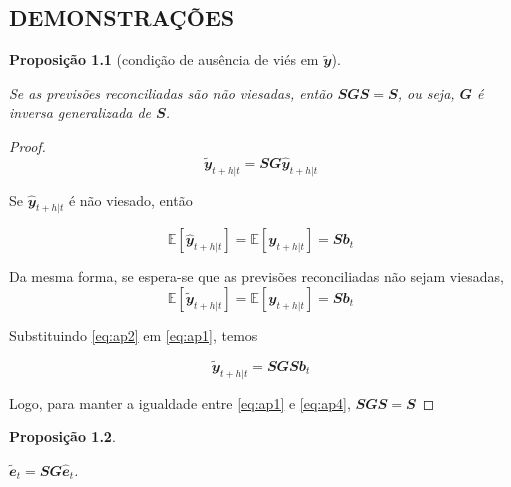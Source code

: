 \documentclass[
  12pt,
  twoside,
  openright,
  a4paper,
  chapter=TITLE,
  section=TITLE,
  brazil]{abntex2}
\newtheorem{proposition}{Proposição}[chapter]
\begin{document}
\begin{apendicesenv}
\chapter{DEMONSTRAÇÕES} \label{apendice_demonstracoes}

\begin{proposition}[condição de ausência de viés em $\mathbfit{\tilde{y}}$]
  \label{proposicao1}

  Se as previsões reconciliadas são não viesadas, então $\mathbfit{SGS=S}$, ou seja, $\mathbfit{G}$ é inversa generalizada de $\mathbfit{S}$.

\end{proposition}

\begin{proof}
  \begin{equation} \label{eq:ap1}
    \mathbfit{\tilde{y}}_{t+h|t} = \mathbfit{SG\hat{y}}_{t+h|t} 
  \end{equation}

  Se $\mathbfit{\hat{y}}_{t+h|t}$ é não viesado, então 

  \begin{equation} \label{eq:ap2}
      \mathbb{E}[\mathbfit{\hat{y}}_{t+h|t}] = \mathbb{E}[\mathbfit{y}_{t+h|t}] = \mathbfit{Sb}_t
  \end{equation}

  Da mesma forma, se espera-se que as previsões reconciliadas não sejam viesadas,
  \begin{equation} \label{eq:ap3}
      \mathbb{E}[\mathbfit{\tilde{y}}_{t+h|t}] = \mathbb{E}[\mathbfit{y}_{t+h|t}] = \mathbfit{Sb}_t
  \end{equation}

  Substituindo \eqref{eq:ap2} em \eqref{eq:ap1}, temos

  \begin{equation} \label{eq:ap4}
      \mathbfit{\tilde{y}}_{t+h|t} = \mathbfit{SGSb}_t 
  \end{equation}

  Logo, para manter a igualdade entre \eqref{eq:ap1} e \eqref{eq:ap4}, $\mathbfit{SGS=S}$

\end{proof}

\begin{proposition}
  \label{proposicao2}

  $\mathbfit{\tilde{e}}_t = \mathbfit{SG\hat{e}}_t$.

\end{proposition}


\end{apendicesenv}
\end{document}
